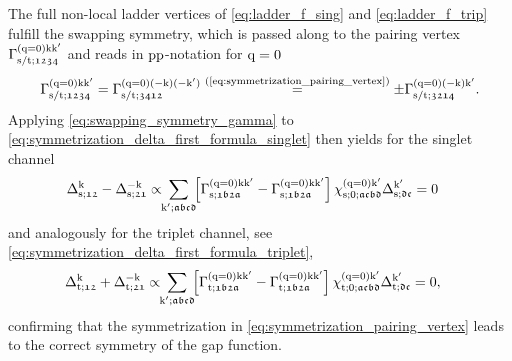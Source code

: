 \documentclass[../../main.tex]{subfiles}
\begin{document}
The full non-local ladder vertices of \eqref{eq:ladder_f_sing} and \eqref{eq:ladder_f_trip} fulfill the swapping symmetry, which is passed along to the pairing vertex $\Gamma^{(\text{q}=0)\text{k}\text{k}'}_{\text{s}/\text{t};\mathfrak{1234}}$ and reads in $\text{pp}$-notation for $\text{q}=0$
\begin{align}\label{eq:swapping_symmetry_gamma}
	\Gamma^{(\text{q}=0)\text{k}\text{k}'}_{\text{s}/\text{t};\mathfrak{1234}}=\Gamma^{(\text{q}=0)(-\text{k})(-\text{k}')}_{\text{s}/\text{t};\mathfrak{3412}}\overset{\text{(\ref{eq:symmetrization_pairing_vertex})}}{=}\pm \Gamma^{(\text{q}=0)(-\text{k})\text{k}'}_{\text{s}/\text{t};\mathfrak{3214}}.
\end{align}
Applying \eqref{eq:swapping_symmetry_gamma} to \eqref{eq:symmetrization_delta_first_formula_singlet} then yields for the singlet channel
\begin{align}
	\Delta_{\text{s};\mathfrak{12}}^{\text{k}}-\Delta_{\text{s};\mathfrak{21}}^{-\text{k}}&\propto\!\!\sum_{\text{k}';\mathfrak{abcd}}\!\! \left [\Gamma^{(\text{q}=0)\text{k}\text{k}'}_{\text{s};\mathfrak{1b2a}}-\Gamma^{(\text{q}=0)\text{k}\text{k}'}_{\text{s};\mathfrak{1b2a}}\right ]\chi^{(\text{q}=0)\text{k}'}_{\text{s};0;\mathfrak{acbd}}\Delta_{\text{s};\mathfrak{dc}}^{\text{k}'}=0
\end{align}
and analogously for the triplet channel, see \eqref{eq:symmetrization_delta_first_formula_triplet},
\begin{align}
	\Delta_{\text{t};\mathfrak{12}}^{\text{k}}+\Delta_{\text{t};\mathfrak{21}}^{-\text{k}}&\propto\!\!\sum_{\text{k}';\mathfrak{abcd}}\!\! \left [\Gamma^{(\text{q}=0)\text{k}\text{k}'}_{\text{t};\mathfrak{1b2a}}-\Gamma^{(\text{q}=0)\text{k}\text{k}'}_{\text{t};\mathfrak{1b2a}}\right ]\chi^{(\text{q}=0)\text{k}'}_{\text{t};0;\mathfrak{acbd}}\Delta_{\text{t};\mathfrak{dc}}^{\text{k}'}=0,
\end{align}
confirming that the symmetrization in \eqref{eq:symmetrization_pairing_vertex} leads to the correct symmetry of the gap function.
\end{document}
